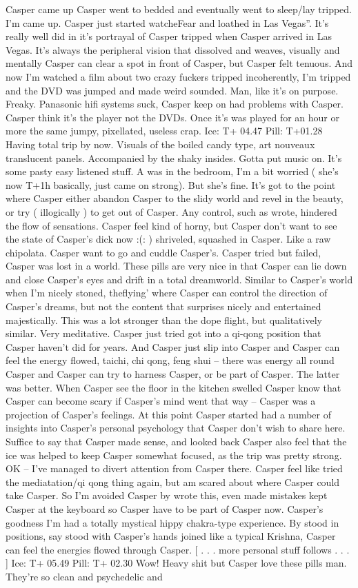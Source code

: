 \documentclass[12pt]{book}
\begin{document}
Casper came up Casper went to bedded and eventually went to sleep/lay tripped. I'm came up. Casper just started watcheFear and loathed in Las Vegas''. It's really well did in it's portrayal of Casper tripped when Casper arrived in Las Vegas. It's always the peripheral vision that dissolved and weaves, visually and mentally Casper can clear a spot in front of Casper, but Casper felt tenuous. And now I'm watched a film about two crazy fuckers tripped incoherently, I'm tripped and the DVD was jumped and made weird sounded. Man, like it's on purpose. Freaky. Panasonic hifi systems suck, Casper keep on had problems with Casper. Casper think it's the player not the DVDs. Once it's was played for an hour or more the same jumpy, pixellated, useless crap. Ice: T+ 04.47 Pill: T+01.28 Having total trip by now. Visuals of the boiled candy type, art nouveaux translucent panels. Accompanied by the shaky insides. Gotta put music on. It's some pasty easy listened stuff. A was in the bedroom, I'm a bit worried ( she's now T+1h basically, just came on strong). But she's fine. It's got to the point where Casper either abandon Casper to the slidy world and revel in the beauty, or try ( illogically ) to get out of Casper. Any control, such as wrote, hindered the flow of sensations. Casper feel kind of horny, but Casper don't want to see the state of Casper's dick now :(: ) shriveled, squashed in Casper. Like a raw chipolata. Casper want to go and cuddle Casper's. Casper tried but failed, Casper was lost in a world. These pills are very nice in that Casper can lie down and close Casper's eyes and drift in a total dreamworld. Similar to Casper's world when I'm nicely stoned, theflying' where Casper can control the direction of Casper's dreams, but not the content that surprises nicely and entertained majestically. This was a lot stronger than the dope flight, but qualitatively similar. Very meditative. Casper just tried got into a qi-qong position that Casper haven't did for years. And Casper just slip into Casper and Casper can feel the energy flowed, taichi, chi qong, feng shui -- there was energy all round Casper and Casper can try to harness Casper, or be part of Casper. The latter was better. When Casper see the floor in the kitchen swelled Casper know that Casper can become scary if Casper's mind went that way -- Casper was a projection of Casper's feelings. At this point Casper started had a number of insights into Casper's personal psychology that Casper don't wish to share here. Suffice to say that Casper made sense, and looked back Casper also feel that the ice was helped to keep Casper somewhat focused, as the trip was pretty strong. OK -- I've managed to divert attention from Casper there. Casper feel like tried the mediatation/qi qong thing again, but am scared about where Casper could take Casper. So I'm avoided Casper by wrote this, even made mistakes kept Casper at the keyboard so Casper have to be part of Casper now. Casper's goodness I'm had a totally mystical hippy chakra-type experience. By stood in positions, say stood with Casper's hands joined like a typical Krishna, Casper can feel the energies flowed through Casper. [ . . . more personal stuff follows . . . ] Ice: T+ 05.49 Pill: T+ 02.30 Wow! Heavy shit but Casper love these pills man. They're so clean and psychedelic and 
\end{document}
